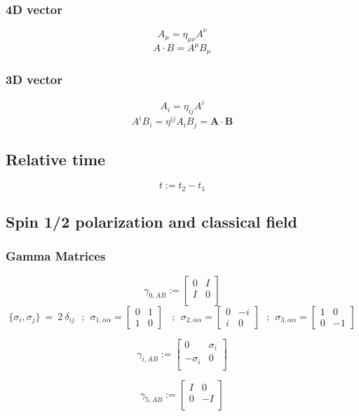 \documentclass[11pt,a4paper]{article}
\begin{document}
\subsubsection{4D vector}
\[ A_\mu = \eta_{\mu\nu}A^\nu\]\[A\cdot B = A^\mu B_\mu\]
\subsubsection{3D vector}
\[ A_i = \eta_{ij}A^i\]\[A^iB_i = \eta^{ij}A_iB_j=\boldsymbol{A}\cdot\boldsymbol{B}\]
\subsection{Relative time}
  
\[  t:= t_2-t_1 \]
\subsection{Spin 1/2 polarization and classical field}

\subsubsection{Gamma Matrices}
\[\gamma_{0,AB}:= \begin{bmatrix}
        0 & I \\
        I & 0 \\
    \end{bmatrix} \]  
\[\{\sigma _{i} ,\sigma _{j}\} \ =\ 2\ \delta _{ij} \ \ \ ;\ \ \sigma _{1,\alpha\dot\alpha } =\begin{bmatrix}
0 & 1\\
1 & 0
\end{bmatrix} \ \ \ \ ;\ \ \sigma _{2,\alpha\dot\alpha} =\begin{bmatrix}
0 & -i\\
i & 0
\end{bmatrix} \ \ \ ;\ \ \sigma _{3,\alpha\dot\alpha} =\begin{bmatrix}
1 & 0\\
0 & -1
\end{bmatrix}\]
  
\[  \gamma_{i,AB} :=
    \begin{bmatrix}
        0 & \sigma_i \\
        -\sigma_i & 0 \\
    \end{bmatrix} \]
    
\[  \gamma_{5,AB} := \begin{bmatrix}
        I & 0 \\
        0 & -I \\
    \end{bmatrix} \]
\end{document}

